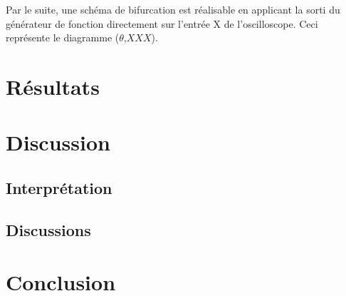 \documentclass[a4paper,12pt,oneside]{article}
\begin{document}
Par le suite, une schéma de bifurcation est réalisable en applicant la sorti du générateur de fonction directement sur l'entrée X de l'oscilloscope. Ceci représente le diagramme ($\theta$,$XXX$).%

\section{Résultats}

\begin{figure}[h!]
  \begin{center}
  \caption{} \label{fig:}
  \end{center}
\end{figure}

\section{Discussion}%

\subsection{Interprétation}

\subsection{Discussions}
\section{Conclusion}






\begin{thebibliography}{99}
\end{thebibliography}
\end{document}
